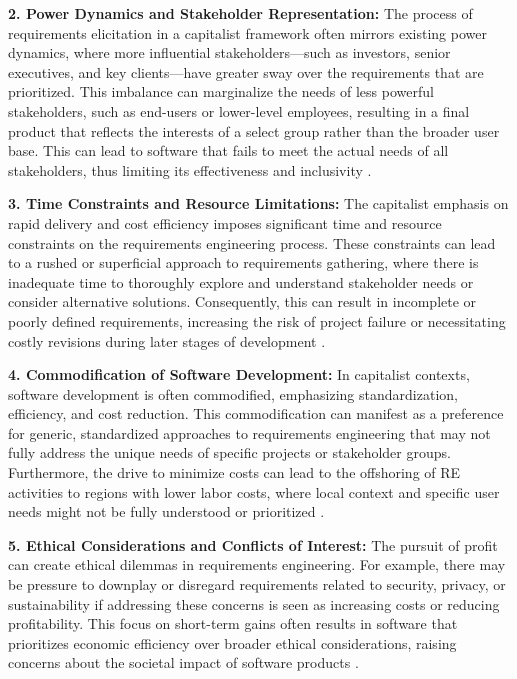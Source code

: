\begin{refsection}
\textbf{2. Power Dynamics and Stakeholder Representation:} The process of requirements elicitation in a capitalist framework often mirrors existing power dynamics, where more influential stakeholders—such as investors, senior executives, and key clients—have greater sway over the requirements that are prioritized. This imbalance can marginalize the needs of less powerful stakeholders, such as end-users or lower-level employees, resulting in a final product that reflects the interests of a select group rather than the broader user base. This can lead to software that fails to meet the actual needs of all stakeholders, thus limiting its effectiveness and inclusivity \cite[pp.~115-135]{freeman2018stakeholder}.

\textbf{3. Time Constraints and Resource Limitations:} The capitalist emphasis on rapid delivery and cost efficiency imposes significant time and resource constraints on the requirements engineering process. These constraints can lead to a rushed or superficial approach to requirements gathering, where there is inadequate time to thoroughly explore and understand stakeholder needs or consider alternative solutions. Consequently, this can result in incomplete or poorly defined requirements, increasing the risk of project failure or necessitating costly revisions during later stages of development \cite[pp.~70-85]{kunda2006engineering}.

\textbf{4. Commodification of Software Development:} In capitalist contexts, software development is often commodified, emphasizing standardization, efficiency, and cost reduction. This commodification can manifest as a preference for generic, standardized approaches to requirements engineering that may not fully address the unique needs of specific projects or stakeholder groups. Furthermore, the drive to minimize costs can lead to the offshoring of RE activities to regions with lower labor costs, where local context and specific user needs might not be fully understood or prioritized \cite[pp.~100-120]{ebert2011global}.

\textbf{5. Ethical Considerations and Conflicts of Interest:} The pursuit of profit can create ethical dilemmas in requirements engineering. For example, there may be pressure to downplay or disregard requirements related to security, privacy, or sustainability if addressing these concerns is seen as increasing costs or reducing profitability. This focus on short-term gains often results in software that prioritizes economic efficiency over broader ethical considerations, raising concerns about the societal impact of software products \cite[pp.~121-136]{winner1980artifacts}.


\end{refsection}
